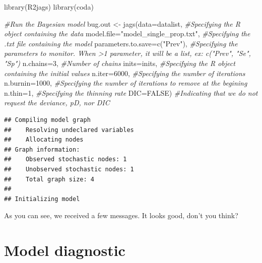 \documentclass[
]{book}
\newenvironment{Shaded}{\begin{snugshade}}{\end{snugshade}}
\newcommand{\AttributeTok}[1]{\textcolor[rgb]{0.77,0.63,0.00}{#1}}
\newcommand{\CommentTok}[1]{\textcolor[rgb]{0.56,0.35,0.01}{\textit{#1}}}
\newcommand{\ConstantTok}[1]{\textcolor[rgb]{0.00,0.00,0.00}{#1}}
\newcommand{\DecValTok}[1]{\textcolor[rgb]{0.00,0.00,0.81}{#1}}
\newcommand{\FunctionTok}[1]{\textcolor[rgb]{0.00,0.00,0.00}{#1}}
\newcommand{\NormalTok}[1]{#1}
\newcommand{\OtherTok}[1]{\textcolor[rgb]{0.56,0.35,0.01}{#1}}
\newcommand{\StringTok}[1]{\textcolor[rgb]{0.31,0.60,0.02}{#1}}
\begin{document}
\begin{Shaded}
\begin{Highlighting}[]
\FunctionTok{library}\NormalTok{(R2jags)}
\FunctionTok{library}\NormalTok{(coda)}

\CommentTok{\#Run the Bayesian model}
\NormalTok{bug.out }\OtherTok{\textless{}{-}} \FunctionTok{jags}\NormalTok{(}\AttributeTok{data=}\NormalTok{datalist,                             }\CommentTok{\#Specifying the R object containing the data}
               \AttributeTok{model.file=}\StringTok{"model\_single\_prop.txt"}\NormalTok{,         }\CommentTok{\#Specifying the .txt file containing the model}
               \AttributeTok{parameters.to.save=}\FunctionTok{c}\NormalTok{(}\StringTok{"Prev"}\NormalTok{),               }\CommentTok{\#Specifying the parameters to monitor. When \textgreater{}1 parameter, it will be a list, ex: c("Prev", "Se", "Sp")}
               \AttributeTok{n.chains=}\DecValTok{3}\NormalTok{,                                 }\CommentTok{\#Number of chains}
               \AttributeTok{inits=}\NormalTok{inits,                                }\CommentTok{\#Specifying the R object containing the initial values  }
               \AttributeTok{n.iter=}\DecValTok{6000}\NormalTok{,                                }\CommentTok{\#Specifying the number of iterations}
               \AttributeTok{n.burnin=}\DecValTok{1000}\NormalTok{,                              }\CommentTok{\#Specifying the number of iterations to remove at the begining}
               \AttributeTok{n.thin=}\DecValTok{1}\NormalTok{,                                   }\CommentTok{\#Specifying the thinning rate}
               \AttributeTok{DIC=}\ConstantTok{FALSE}\NormalTok{)                                  }\CommentTok{\#Indicating that we do not request the deviance, pD, nor DIC }
\end{Highlighting}
\end{Shaded}

\begin{verbatim}
## Compiling model graph
##    Resolving undeclared variables
##    Allocating nodes
## Graph information:
##    Observed stochastic nodes: 1
##    Unobserved stochastic nodes: 1
##    Total graph size: 4
## 
## Initializing model
\end{verbatim}

As you can see, we received a few messages. It looks good, don't you
think?

\hypertarget{model-diagnostic}{%
\section{Model diagnostic}\label{model-diagnostic}}
\end{document}

